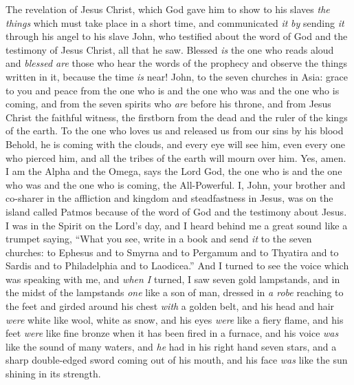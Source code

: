 
\begin{biblechapter} %
 The revelation of Jesus Christ, which God gave him to show to his slaves \textit{the things} which must take place in a short time, and communicated \textit{it} \textit{by} sending \textit{it} through his angel to his slave John,
\verse who testified about the word of God and the testimony of Jesus Christ, all that he saw.
\verse Blessed \textit{is} the one who reads aloud and \textit{blessed are} those who hear the words of the prophecy and observe the things written in it, because the time \textit{is} near!
 John, to the seven churches in Asia: grace to you and peace from the one who is and the one who was and the one who is coming, and from the seven spirits who \textit{are} before his throne,
\verse and from Jesus Christ the faithful witness, the firstborn from the dead and the ruler of the kings of the earth.
\verse To the one who loves us and released us from our sins by his blood
\verse Behold, he is coming with the clouds, 
and every eye will see him, 
even every one who pierced him, 
and all the tribes of the earth will mourn over him. Yes, amen.
\verse I am the Alpha and the Omega, says the Lord God, the one who is and the one who was and the one who is coming, the All-Powerful.
 I, John, your brother and co-sharer in the affliction and kingdom and steadfastness in Jesus, was on the island called Patmos because of the word of God and the testimony about Jesus.
\verse I was in the Spirit on the Lord’s day, and I heard behind me a great sound like a trumpet
\verse saying, “What you see, write in a book and send \textit{it} to the seven churches: to Ephesus and to Smyrna and to Pergamum and to Thyatira and to Sardis and to Philadelphia and to Laodicea.”
\verse And I turned to see the voice which was speaking with me, and \textit{when I} turned, I saw seven gold lampstands,
\verse and in the midst of the lampstands \textit{one} like a son of man, dressed in \textit{a robe} reaching to the feet and girded around his chest \textit{with} a golden belt,
\verse and his head and hair \textit{were} white like wool, white as snow, and his eyes \textit{were} like a fiery flame,
\verse and his feet \textit{were} like fine bronze when it has been fired in a furnace, and his voice \textit{was} like the sound of many waters,
\verse and \textit{he} had in his right hand seven stars, and a sharp double-edged sword coming out of his mouth, and his face \textit{was} like the sun shining in its strength.

\end{biblechapter}
